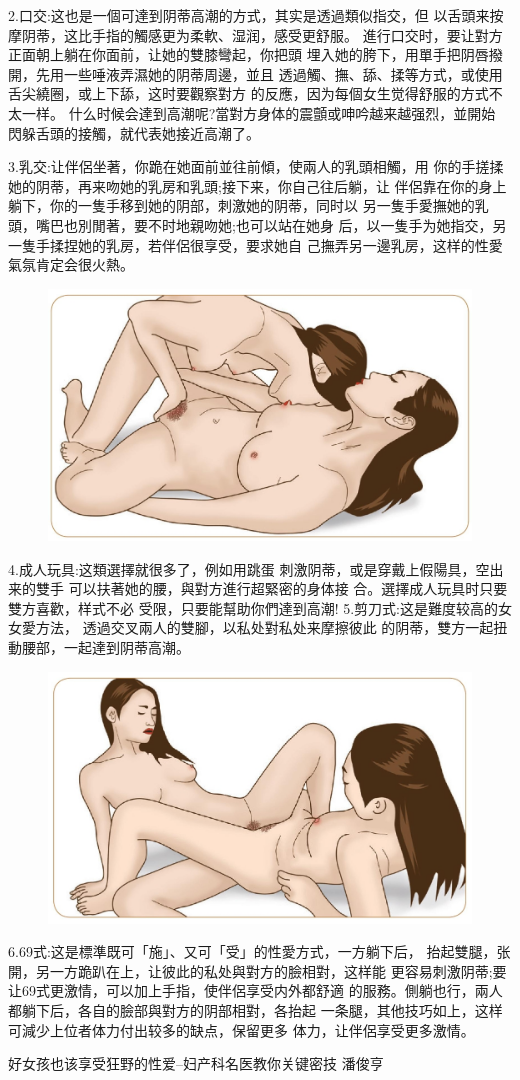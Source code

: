 \documentclass[12pt,UTF8]{ctexbook}
\begin{document}
2.口交:这也是一個可達到阴蒂高潮的方式，其实是透過類似指交，但
以舌頭来按摩阴蒂，这比手指的觸感更为柔軟、湿润，感受更舒服。
進行口交时，要让對方正面朝上躺在你面前，让她的雙膝彎起，你把頭
埋入她的胯下，用單手把阴唇撥開，先用一些唾液弄濕她的阴蒂周邊，並且
透過觸、撫、舔、揉等方式，或使用舌尖繞圈，或上下舔，这时要觀察對方
的反應，因为每個女生觉得舒服的方式不太一样。
什么时候会達到高潮呢?當對方身体的震顫或呻吟越来越强烈，並開始
閃躲舌頭的接觸，就代表她接近高潮了。

3.乳交:让伴侶坐著，你跪在她面前並往前傾，使兩人的乳頭相觸，用
你的手搓揉她的阴蒂，再来吻她的乳房和乳頭;接下来，你自己往后躺，让
伴侶靠在你的身上躺下，你的一隻手移到她的阴部，刺激她的阴蒂，同时以
另一隻手愛撫她的乳頭，嘴巴也別閒著，要不时地親吻她;也可以站在她身
后，以一隻手为她指交，另一隻手揉捏她的乳房，若伴侶很享受，要求她自
己撫弄另一邊乳房，这样的性愛氣氛肯定会很火熱。

\begin{figure}[htbp]
	\centering
	\includegraphics[width=0.7\linewidth]{11}
	\caption{}
	\label{fig:1}
\end{figure}

4.成人玩具:这類選擇就很多了，例如用跳蛋
刺激阴蒂，或是穿戴上假陽具，空出来的雙手
可以扶著她的腰，與對方進行超緊密的身体接
合。選擇成人玩具时只要雙方喜歡，样式不必
受限，只要能幫助你們達到高潮!
5.剪刀式:这是難度较高的女女愛方法，
透過交叉兩人的雙腳，以私处對私处来摩擦彼此
的阴蒂，雙方一起扭動腰部，一起達到阴蒂高潮。

\begin{figure}[htbp]
	\centering
	\includegraphics[width=0.7\linewidth]{12}
	\caption{}
	\label{fig:1}
\end{figure}

6.69式:这是標準既可「施」、又可「受」的性愛方式，一方躺下后，
抬起雙腿，张開，另一方跪趴在上，让彼此的私处與對方的臉相對，这样能
更容易刺激阴蒂;要让69式更激情，可以加上手指，使伴侶享受内外都舒適
的服務。側躺也行，兩人都躺下后，各自的臉部與對方的阴部相對，各抬起
一条腿，其他技巧如上，这样可減少上位者体力付出较多的缺点，保留更多
体力，让伴侶享受更多激情。



\backmatter

好女孩也该享受狂野的性爱--妇产科名医教你关键密技  潘俊亨
\end{document}
